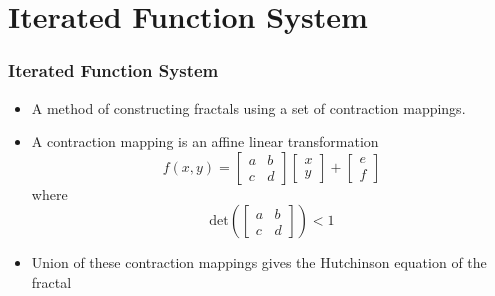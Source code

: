 \documentclass{beamer}
\begin{document}
\section{Iterated Function System}
\begin{frame}
    \frametitle{Iterated Function System}
    \begin{itemize}
        \item A method of constructing fractals using a set of contraction mappings. 
        \item A contraction mapping is an affine linear transformation 
        \begin{equation*}
            f(x, y)=\left[ \begin{array}{ll}{a} & {b} \\ {c} & {d}\end{array}\right] \left[ \begin{array}{l}{x} \\ {y}\end{array}\right]+\left[ \begin{array}{l}{e} \\ {f}\end{array}\right]
        \end{equation*}
        where
        \begin{equation*}
            \text{det}\left(\left[ \begin{array}{ll}{a} & {b} \\ {c} & {d}\end{array}\right]\right) < 1
        \end{equation*}
        \item Union of these contraction mappings gives the Hutchinson equation of the fractal
    \end{itemize}
\end{frame}

\end{document}
